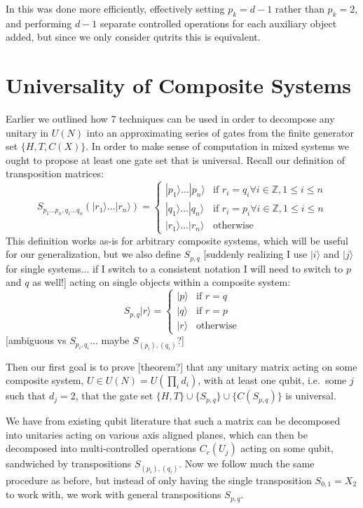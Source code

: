 \documentclass[]{article}
\newcommand{\ket}[1]{| #1 \rangle}
\begin{document}
In \cite{multi-valued-logic} this was done more efficiently, effectively setting $p_k = d-1$ rather than $p_k = 2$, and performing $d-1$ separate controlled operations for each auxiliary object added, but since we only consider qutrits this is equivalent.
\section{Universality of Composite Systems}
Earlier we outlined how 7 techniques can be used in order to decompose any unitary in $U(N)$ into an approximating series of gates from the finite generator set $\{H, T, C(X)\}$. In order to make sense of computation in mixed systems we ought to propose at least one gate set that is universal. Recall our definition of transposition matrices:
\[S_{p_1\dots p_n, q_1\dots q_n}(\ket{r_1}\dots\ket{r_n}) = \begin{cases}
	\ket{p_1}\dots\ket{p_n} & \text{if\ } r_i = q_i \forall i \in \mathbb{Z}, 1 \leq i \leq n \\
	\ket{q_1}\dots\ket{q_n} & \text{if\ } r_i = p_i \forall i \in \mathbb{Z}, 1 \leq i \leq n \\
	\ket{r_1}\dots\ket{r_n} & \text{otherwise}
\end{cases}
\]
This definition works as-is for arbitrary composite systems, which will be useful for our generalization, but we also define $S_{p,q}$ [suddenly realizing I use $\ket{i}$ and $\ket{j}$ for single systems... if I switch to a consistent notation I will need to switch to $p$ and $q$ as well!] acting on single objects within a composite system:
\[S_{p, q}\ket{r} =
\begin{cases}
	\ket{p} & \text{if\ } r = q \\
	\ket{q} & \text{if\ } r = p \\
	\ket{r} & \text{otherwise}
\end{cases}
\]
[ambiguous vs $S_{p_i, q_i}$... maybe $S_{(p_i),(q_i)}$?]

Then our first goal is to prove [theorem?] that any unitary matrix acting on some composite system, $U \in U(N) = U(\prod_i d_i)$, with at least one qubit, i.e.\ some $j$ such that $d_j = 2$, that the gate set $\{H, T\} \cup \{S_{p,q}\} \cup \{C(S_{p,q})\}$ is universal.

We have from existing qubit literature that such a matrix can be decomposed into unitaries acting on various axis aligned planes, which can then be decomposed into multi-controlled operations $C_c(U_j)$ acting on some qubit, sandwiched by transpositions $S_{(p_i),(q_i)}$. Now we follow much the same procedure as before, but instead of only having the single transposition $S_{0, 1} = X_2$ to work with, we work with general transpositions $S_{p, q}$.
\end{document}
